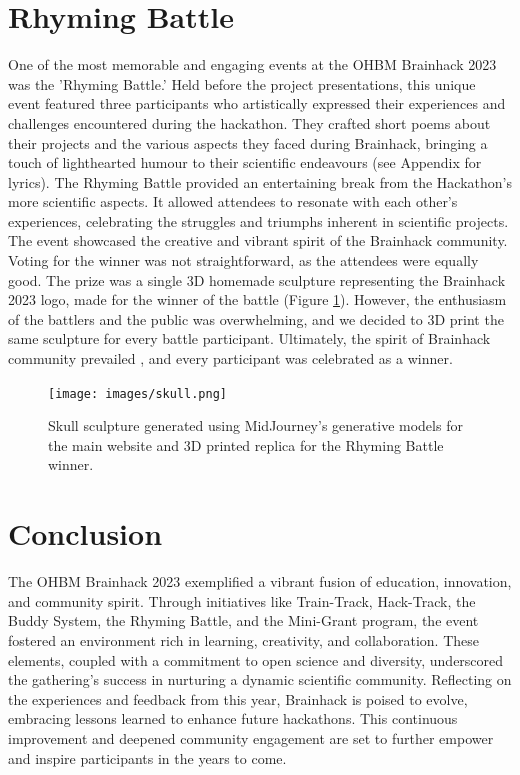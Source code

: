 \documentclass{article}
\begin{document}
\section{Rhyming Battle}

One of the most memorable and engaging events at the OHBM Brainhack 2023 was the 'Rhyming Battle.'
Held before the project presentations, this unique event featured three participants who artistically expressed their experiences and challenges encountered during the hackathon.
They crafted short poems about their projects and the various aspects they faced during Brainhack, bringing a touch of lighthearted humour to their scientific endeavours (see Appendix for lyrics).
The Rhyming Battle provided an entertaining break from the Hackathon's more scientific aspects.
It allowed attendees to resonate with each other's experiences, celebrating the struggles and triumphs inherent in scientific projects.
The event showcased the creative and vibrant spirit of the Brainhack community.
Voting for the winner was not straightforward, as the attendees were equally good.
The prize was a single 3D homemade sculpture representing the Brainhack 2023 logo, made for the winner of the battle (Figure \ref{fig:skull}).
However, the enthusiasm of the battlers and the public was overwhelming, and we decided to 3D print the same sculpture for every battle participant.
Ultimately, the spirit of Brainhack community prevailed \cite{gau2021brainhack,levitis2021centering}, and every participant was celebrated as a winner.

\begin{figure}[h]
    \centering
    \texttt{[image: images/skull.png]}
    \label{fig:skull}
    \caption{
        Skull sculpture generated using MidJourney's generative models for the main website and 3D printed replica for the Rhyming Battle winner. 
    }
\end{figure}

\section{Conclusion}

The OHBM Brainhack 2023 exemplified a vibrant fusion of education, innovation, and community spirit.
Through initiatives like Train-Track, Hack-Track, the Buddy System, the Rhyming Battle, and the Mini-Grant program, the event fostered an environment rich in learning, creativity, and collaboration.
These elements, coupled with a commitment to open science and diversity, underscored the gathering's success in nurturing a dynamic scientific community.
Reflecting on the experiences and feedback from this year, Brainhack is poised to evolve, embracing lessons learned to enhance future hackathons.
This continuous improvement and deepened community engagement are set to further empower and inspire participants in the years to come.



\end{document}
